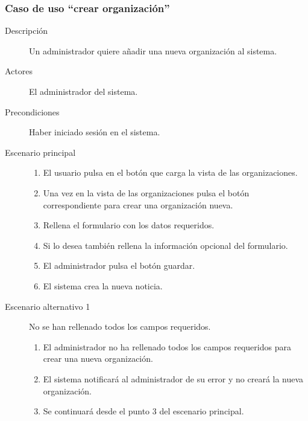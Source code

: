 \subsubsection{Caso de uso ``crear organización''}
\begin{description}
\item[Descripción]  Un administrador quiere añadir una nueva organización al sistema.
\item[Actores]  El administrador del sistema.
\item[Precondiciones] Haber iniciado sesión en el sistema.
\item[Escenario principal]  \hfill
							\begin{enumerate}
							\item El usuario pulsa en el botón que carga la vista de las organizaciones.
							\item Una vez en la vista de las organizaciones pulsa el botón correspondiente para crear una organización nueva.
							\item Rellena el formulario con los datos requeridos.
							\item Si lo desea también rellena la información opcional del formulario.
							\item El administrador pulsa el botón guardar.
							\item El sistema crea la nueva noticia.
							\end{enumerate}
\item[Escenario alternativo 1] No se han rellenado todos los campos requeridos.
							\begin{enumerate}
							\item El administrador no ha rellenado todos los campos requeridos para crear una nueva organización.
							\item El sistema notificará al administrador de su error y no creará la nueva organización.
							\item Se continuará desde el punto 3 del escenario principal.
							\end{enumerate}
\end{description}


